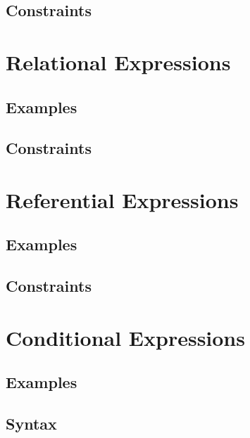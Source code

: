 \documentclass[a4paper,oneside,12pt, extrafontsizes]{memoir}
\begin{document}
    \section{Constraints}
    

  \chapter{Relational Expressions}
  \label{ch:relational}
  

    \section{Examples}
    

    \section{Constraints}
    

  \chapter{Referential Expressions}
  \label{ch:referential}
  

    \section{Examples}
    

    \section{Constraints}
    

  \chapter{Conditional Expressions}
  \label{ch:conditionals}
  

    \section{Examples}
    

    \section{Syntax}
    
\end{document}
